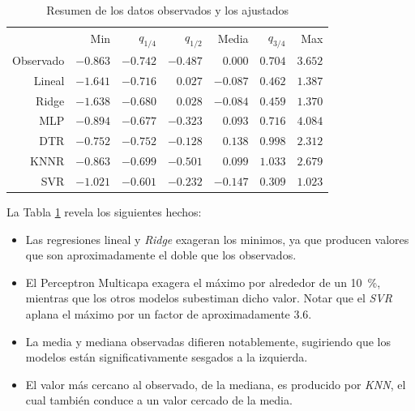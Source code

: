   \begin{table}[hbt]
  \centering
  \caption{Resumen de los datos observados y los ajustados}\label{Tab:Summary}
  \begin{tabular}{*7{r}}
  \toprule
  &Min	&$q_{1/4}$	&$q_{1/2}$	&Media	&$q_{3/4}$	&Max\\ \cmidrule(lr){2-7}
  Observado	&$-0.863$	&$-0.742$	&$-0.487$	&$0.000$	&$0.704$	&$3.652$\\
  Lineal	&$-1.641$	&$-0.716$	&$ 0.027$	&$-0.087$	&$0.462$	&$1.387$\\
  Ridge	&$-1.638$	&$-0.680$	&$ 0.028$	&$-0.084$	&$0.459$	&$1.370$\\
  MLP	&$-0.894$	&$-0.677$	&$-0.323$	&$0.093$	&$0.716$	&$4.084$\\
  DTR	&$-0.752$	&$-0.752$	&$-0.128$	&$0.138$	&$0.998$	&$2.312$\\
  KNNR	&$-0.863$	&$-0.699$	&$-0.501$	&$0.099$	&$1.033$	&$2.679$\\
  SVR	&$-1.021$	&$-0.601$	&$-0.232$	&$-0.147$	&$0.309$	&$1.023$\\
  \bottomrule
  \end{tabular}
  \end{table}

  \par La Tabla \ref{Tab:Summary} revela los siguientes hechos:

    \begin{itemize}
      \item Las regresiones lineal y \textit{Ridge} exageran los minimos, ya
        que producen valores que son aproximadamente el doble que los observados.
      \item El Perceptron Multicapa exagera el máximo por alrededor de un \SI{10}{\percent},
        mientras que los otros modelos subestiman dicho valor. Notar que el \textit{SVR}
        aplana el máximo por un factor de aproximadamente 3.6.
      \item La media y mediana observadas difieren notablemente, sugiriendo que
        los modelos están significativamente sesgados a la izquierda.
      \item El valor más cercano al observado, de la mediana, es producido por
        \textit{KNN}, el cual también conduce a un valor cercado de la media.

    \end{itemize}


